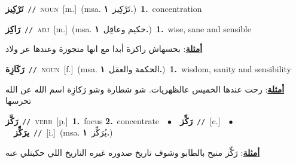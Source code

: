 \documentclass[10pt,a4paper,twoside]{article} %
\begin{document}
\begin{multicols}{2}
{\setlength\topsep{0pt}\textbf{\foreignlanguage{arabic}{تَرْكِيز}}\ {\color{gray}\texttt{//}\color{black}}\ \textsc{noun}\ [m.]\ \color{gray}(msa. \foreignlanguage{arabic}{تَرْكِيز}~\foreignlanguage{arabic}{\textbf{١.}})\color{black}\ \textbf{1.}~concentration\ } \vspace{2mm}

{\setlength\topsep{0pt}\textbf{\foreignlanguage{arabic}{رَاكِز}}\ {\color{gray}\texttt{//}\color{black}}\ \textsc{adj}\ [m.]\ \color{gray}(msa. \foreignlanguage{arabic}{حكيم وعاقِل}~\foreignlanguage{arabic}{\textbf{١.}})\color{black}\ \textbf{1.}~wise, sane and sensible\  \begin{flushright}\color{gray}\foreignlanguage{arabic}{\textbf{\underline{\foreignlanguage{arabic}{أمثلة}}}: بحسهاش راكزة أبدا مع انها متجوزة وعندها عر ولاد}\end{flushright}\color{black}} \vspace{2mm}

{\setlength\topsep{0pt}\textbf{\foreignlanguage{arabic}{رَكَازِة}}\ {\color{gray}\texttt{//}\color{black}}\ \textsc{noun}\ [f.]\ \color{gray}(msa. \foreignlanguage{arabic}{الحكمة والعقل}~\foreignlanguage{arabic}{\textbf{١.}})\color{black}\ \textbf{1.}~wisdom, sanity and sensibility\  \begin{flushright}\color{gray}\foreignlanguage{arabic}{\textbf{\underline{\foreignlanguage{arabic}{أمثلة}}}: رحت عندها الخميس عالظهريات. شو شطارة وشو رَكازِة اسم الله عن الله تحرسها}\end{flushright}\color{black}} \vspace{2mm}

{\setlength\topsep{0pt}\textbf{\foreignlanguage{arabic}{رَكَّز}}\ {\color{gray}\texttt{//}\color{black}}\ \textsc{verb}\ [p.]\ \textbf{1.}~focus  \textbf{2.}~concentrate\ \ $\bullet$\ \ \setlength\topsep{0pt}\textbf{\foreignlanguage{arabic}{رَكِّز}}\ {\color{gray}\texttt{//}\color{black}}\ [c.]\ \ $\bullet$\ \ \setlength\topsep{0pt}\textbf{\foreignlanguage{arabic}{يرَكِّز}}\ {\color{gray}\texttt{//}\color{black}}\ [i.]\ \color{gray}(msa. \foreignlanguage{arabic}{يُرَكِّز}~\foreignlanguage{arabic}{\textbf{١.}})\color{black}\  \begin{flushright}\color{gray}\foreignlanguage{arabic}{\textbf{\underline{\foreignlanguage{arabic}{أمثلة}}}: رَكِّز منيح بالطابو وشوف تاريخ صدوره غيره التاريخ اللي حكيتلي عنه}\end{flushright}\color{black}} \vspace{2mm}


\end{multicols}
\end{document}
